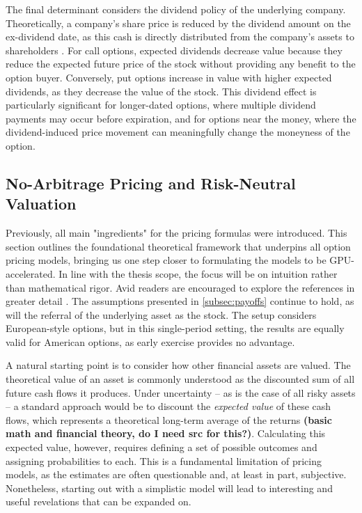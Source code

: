 \documentclass[english,12pt,a4paper,pdftex,sci,utf8]{aaltothesis}
\begin{document}
The final determinant considers the dividend policy of the underlying company. Theoretically, a company's share price is reduced by the dividend amount on the ex-dividend date, as this cash is directly distributed from the company's assets to shareholders \cite{modigliani1958cost}. For call options, expected dividends decrease value because they reduce the expected future price of the stock without providing any benefit to the option buyer. Conversely, put options increase in value with higher expected dividends, as they decrease the value of the stock. This dividend effect is particularly significant for longer-dated options, where multiple dividend payments may occur before expiration, and for options near the money, where the dividend-induced price movement can meaningfully change the moneyness of the option.

\subsection{No-Arbitrage Pricing and Risk-Neutral Valuation}\label{sec:risk-neutral-theory}
Previously, all main "ingredients" for the pricing formulas were introduced. This section outlines the foundational theoretical framework that underpins all option pricing models, bringing us one step closer to formulating the models to be GPU-accelerated. In line with the thesis scope, the focus will be on intuition rather than mathematical rigor. Avid readers are encouraged to explore the references in greater detail \cite{hull2016options, gisiger2010risk, tham2001risk}. The assumptions presented in \cref{subsec:payoffs} continue to hold, as will the referral of the underlying asset as the stock. The setup considers European-style options, but in this single-period setting, the results are equally valid for American options, as early exercise provides no advantage.

A natural starting point is to consider how other financial assets are valued. The theoretical value of an asset is commonly understood as the discounted sum of all future cash flows it produces. Under uncertainty -- as is the case of all risky assets -- a standard approach would be to discount the \emph{expected value} of these cash flows, which represents a theoretical long-term average of the returns \textbf{(basic math and financial theory, do I need src for this?)}. Calculating this expected value, however, requires defining a set of possible outcomes and assigning probabilities to each. This is a fundamental limitation of pricing models, as the estimates are often questionable and, at least in part, subjective. Nonetheless, starting out with a simplistic model will lead to interesting and useful revelations that can be expanded on.
\end{document}
